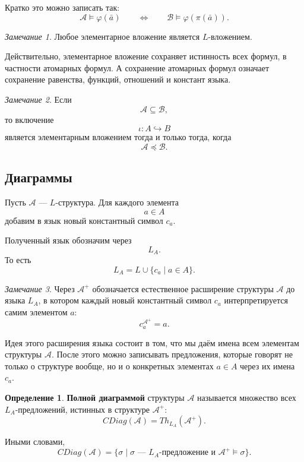 \documentclass[12pt,a4paper,oneside,openany]{book}
\theoremstyle{definition}
\newtheorem{definition}{Определение}[chapter]
\theoremstyle{plain}
\theoremstyle{remark}
\newtheorem{remark}{Замечание}[chapter]
\begin{document}
Кратко это можно записать так:
\[
\mathcal A\models\varphi(\bar a)
\qquad
\Longleftrightarrow
\qquad
\mathcal B\models\varphi(\pi(\bar a)).
\]

\begin{remark}
Любое элементарное вложение является $L$-вложением.

Действительно, элементарное вложение сохраняет истинность всех формул, в частности атомарных формул. А сохранение атомарных формул означает сохранение равенства, функций, отношений и констант языка.
\end{remark}

\begin{remark}
Если
\[
\mathcal A\subseteq\mathcal B,
\]
то включение
\[
\iota:A\hookrightarrow B
\]
является элементарным вложением тогда и только тогда, когда
\[
\mathcal A\preccurlyeq\mathcal B.
\]
\end{remark}

\subsection{Диаграммы}

Пусть $\mathcal A$ — $L$-структура. Для каждого элемента
\[
a\in A
\]
добавим в язык новый константный символ $c_a$.

Полученный язык обозначим через
\[
L_A.
\]
То есть
\[
L_A=L\cup\{c_a\mid a\in A\}.
\]

\begin{remark}
Через $\mathcal A^+$ обозначается естественное расширение структуры $\mathcal A$ до языка $L_A$, в котором каждый новый константный символ $c_a$ интерпретируется самим элементом $a$:
\[
c_a^{\mathcal A^+}=a.
\]
\end{remark}

Идея этого расширения языка состоит в том, что мы даём имена всем элементам структуры $\mathcal A$. После этого можно записывать предложения, которые говорят не только о структуре вообще, но и о конкретных элементах $a\in A$ через их имена $c_a$.


\begin{definition}
\textbf{Полной диаграммой} структуры $\mathcal A$ называется множество всех $L_A$-предложений, истинных в структуре $\mathcal A^+$:
\[
CDiag(\mathcal A)=Th_{L_A}(\mathcal A^+).
\]
\end{definition}

Иными словами,
\[
CDiag(\mathcal A)
=
\{\sigma\mid \sigma \text{ — }L_A\text{-предложение и } \mathcal A^+\models\sigma\}.
\]
\end{document}
